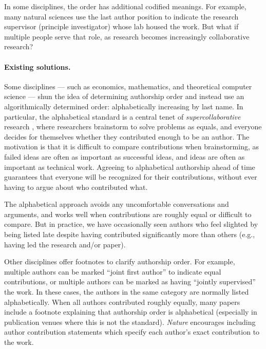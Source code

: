 \documentclass[natbib,authoryear]{sigtbd17-style}
\begin{document}
In some disciplines, the order has additional codified meanings.
For example, many natural sciences use the last author position to indicate the
research supervisor (principle investigator) whose lab housed the work.
But what if multiple people serve that role, as research becomes
increasingly collaborative research?

\paragraph{Existing solutions.}

Some disciplines --- such as economics, mathematics, and
theoretical computer science --- shun the idea of determining authorship order
and instead use an algorithmically determined order:
alphabetically increasing by last name.
In particular, the alphabetical standard is a central tenet of
\emph{supercollaborative} research \citep{supercollaboration},
where researchers brainstorm to solve problems as equals,
and everyone decides for themselves whether they contributed
enough to be an author.
The motivation is that it is difficult to compare contributions when
brainstorming, as failed ideas are often as important as successful ideas,
and ideas are often as important as technical work.
Agreeing to alphabetical authorship ahead of time guarantees that everyone
will be recognized for their contributions, without ever having to argue
about who contributed what.

The alphabetical approach avoids any uncomfortable conversations and arguments,
and works well when contributions are roughly equal or difficult to compare.
But in practice, we have occasionally seen authors who feel slighted
by being listed late despite having contributed significantly more than others
(e.g., having led the research and/or paper).

Other disciplines offer footnotes to clarify authorship order. For example,
multiple authors can be marked ``joint first author'' to indicate
equal contributions, or multiple authors can be marked as having
``jointly supervised'' the work.
In these cases, the authors in the same category
are normally listed alphabetically.
When all authors contributed roughly equally,
many papers include a footnote explaining that authorship order is alphabetical
(especially in publication venues where this is not the standard).
\emph{Nature} encourages including author contribution statements which
specify each author's exact contribution to the work.
\end{document}
